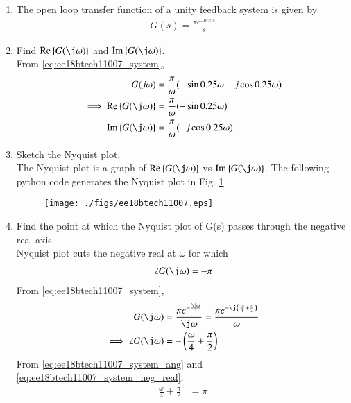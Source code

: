 \begin{enumerate}[label=\thesection.\arabic*.,ref=\thesection.\theenumi]
\item The open loop transfer function of a unity feedback system is given by
\begin{align}
\label{eq:ee18btech11007_system}
 G(s)=\frac{\pi e^{-0.25s}}{s}
\end{align}
\item Find $\text{Re} \cbrak{G(\j \omega)}$ and $\text{Im} \cbrak{G(\j \omega)}$.
\\
\solution From \eqref{eq:ee18btech11007_system},
%
\begin{align}
G(j\omega)&=\frac{\pi}{\omega}(-\sin{0.25\omega}-j\cos{0.25\omega})
\\
\implies  \text{Re} \cbrak{G(\j \omega)}&=\frac{\pi}{\omega}(-\sin{0.25\omega}) 
\\
 \text{Im} \cbrak{G(\j \omega)}&=\frac{\pi}{\omega}(-j\cos{0.25\omega}) 
\end{align}
%
\item Sketch the Nyquist plot.
\\
\solution The Nyquist plot is a graph of $\text{Re} \cbrak{G(\j \omega)}$  vs $\text{Im} \cbrak{G(\j \omega)}$.
The following python code generates the Nyquist plot in Fig.  \ref{fig:ee18btech11007}
%
\begin{figure}[!h]
  \texttt{[image: ./figs/ee18btech11007.eps]}
  \caption{}
  \label{fig:ee18btech11007}
\end{figure}
%
\item Find the point at which the Nyquist plot of G(s) passes through the negative real axis
\\
\solution  Nyquist plot cuts the negative real at $\omega $ for which 
\begin{align}
\angle G(\j\omega)=-\pi
\label{eq:ee18btech11007_system_neg_real}
\end{align}
From \eqref{eq:ee18btech11007_system},
\begin{align}
 G(\j\omega)&=\frac{\pi e^{-\frac{\j\omega}{4}}}{\j\omega} = \frac{\pi e^{-\j\brak{\frac{\omega}{4}+\frac{\pi}{2}}}}{\omega}
\\
\implies \angle{ G(\j\omega)} &= -\brak{\frac{\omega}{4}+\frac{\pi}{2}}
\label{eq:ee18btech11007_system_ang}
\end{align}
From \eqref{eq:ee18btech11007_system_ang} and \eqref{eq:ee18btech11007_system_neg_real}, 
\begin{align}
\frac{\omega}{4}+\frac{\pi}{2} &= \pi

\end{align}
\end{enumerate}
